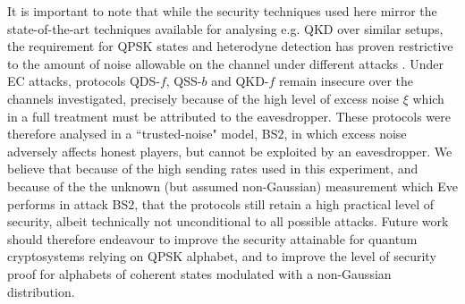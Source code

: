 It is important to note that while the security techniques used here mirror the state-of-the-art techniques available for analysing e.g. QKD \cite{Papanastasiou2018} over similar setups, the requirement for QPSK states and heterodyne detection has proven restrictive to the amount of noise allowable on the channel under different attacks \cite{Zhao2009, Bradler2018}. Under EC attacks, protocols QDS-$f$, QSS-$b$ and QKD-$f$ remain insecure over the channels investigated, precisely because of the high level of excess noise $\xi$ which in a full treatment must be attributed to the eavesdropper. These protocols were therefore analysed in a ``trusted-noise" model, BS$2$, in which excess noise adversely affects honest players, but cannot be exploited by an eavesdropper. We believe that because of the high sending rates used in this experiment, and because of the the unknown (but assumed non-Gaussian) measurement which Eve performs in attack BS$2$, that the protocols still retain a high practical level of security, albeit technically not unconditional to all possible attacks. Future work should therefore endeavour to improve the security attainable for quantum cryptosystems relying on QPSK alphabet, and to improve the level of security proof for alphabets of coherent states modulated with a non-Gaussian distribution.

